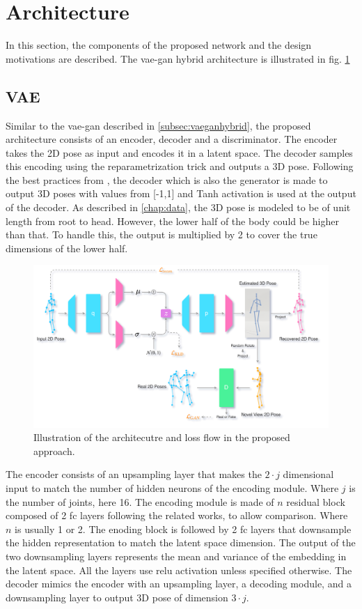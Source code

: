 \section{Architecture}

In this section, the components of the proposed network and the design motivations are described. The \ac{vae}-\ac{gan} hybrid architecture is illustrated in fig. \ref{fig:method_arch}

\subsection{VAE} 
Similar to the \ac{vae}-\ac{gan} described in \ref{subsec:vaeganhybrid}, the proposed architecture consists of an encoder, decoder and a discriminator. The encoder takes the 2D pose as input and encodes it in a latent space. The decoder samples this encoding using the reparametrization trick and outputs a 3D pose. Following the best practices from \cite{soumith2017wasserstein}, the decoder which is also the generator is made to output 3D poses with values from [-1,1] and Tanh activation is used at the output of the decoder. As described in \ref{chap:data}, the 3D pose is modeled to be of unit length from root to head. However, the lower half of the body could be higher than that. To handle this, the output is multiplied by 2 to cover the true dimensions of the lower half.

\begin{figure}[h]
    \centering
    \includegraphics[width=\textwidth]{figures/arch/method_arch.png}
    \caption{Illustration of the architecutre and loss flow in the proposed approach. }
    \label{fig:method_arch}
\end{figure}


The encoder consists of an upsampling layer that makes the $2 \cdot j$ dimensional input to match the number of hidden neurons of the encoding module. Where $j$ is the number of joints, here 16. The encoding module is made of $n$ residual block composed of 2 \ac{fc} layers following the related works, to allow comparison. Where $n$ is usually 1 or 2. The enoding block is followed by 2 \ac{fc} layers that downsample the hidden representation to match the latent space dimension. The output of the two downsampling layers represents the mean and variance of the embedding in the latent space. All the layers use \ac{relu} activation unless specified otherwise. The decoder mimics the encoder with an upsampling layer, a decoding module, and a downsampling layer to output 3D pose of dimension $3 \cdot j$.

